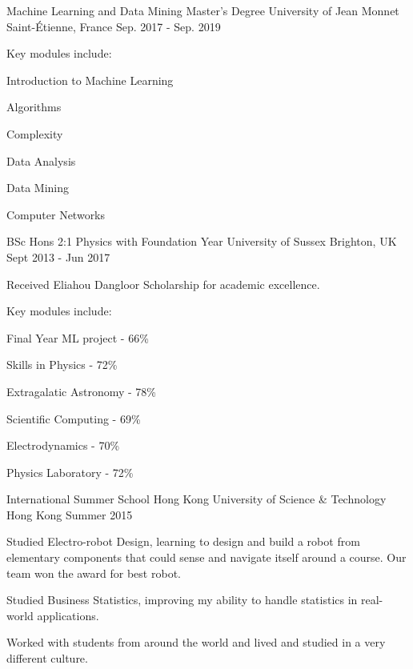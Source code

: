 \begin{cventries}
	\cventry
	{Machine Learning and Data Mining Master's Degree}
	{University of Jean Monnet}
	{Saint-\'{E}tienne, France}
	{Sep. 2017 - Sep. 2019}
	{
		\begin{cvitems}
			\item{Key modules include:}
			\setlength\multicolsep{0pt}
			\begin{multicols}{3}
				\item{Introduction to Machine Learning}
				\item{Algorithms}
				\item{Complexity}
				\item{Data Analysis}
				\item{Data Mining}
				\item{Computer Networks}
			\end{multicols}
		\end{cvitems}
	}
	
	\cventry
    {BSc Hons 2:1 Physics with Foundation Year}
    {University of Sussex}
    {Brighton, UK}
    {Sept 2013 - Jun 2017}
    {
      \begin{cvitems}
      \item{Received Eliahou Dangloor Scholarship for academic excellence.}
      \item{Key modules include:}
      \setlength\multicolsep{0pt}
      \begin{multicols}{3}
        \item{Final Year ML project - 66\% }
        \item{Skills in Physics - 72\%}
        \item{Extragalatic Astronomy - 78\%}
        \item{Scientific Computing - 69\%}
        \item{Electrodynamics - 70\%}
        \item{Physics Laboratory - 72\%}
      \end{multicols}
      \end{cvitems}
    }
    
	\cventry
	{International Summer School}
	{Hong Kong University of Science \& Technology}
	{Hong Kong}
	{Summer 2015}
	{
		\begin{cvitems}
			\item {Studied Electro-robot Design, learning to design and build a robot from elementary components that could sense and navigate itself around a course. Our team won the award for best robot.}
			\item {Studied Business Statistics, improving my ability to handle statistics in real-world applications.}
			\item {Worked with students from around the world and lived and studied in a very different culture.}
		\end{cvitems}
	}
	

\end{cventries}

